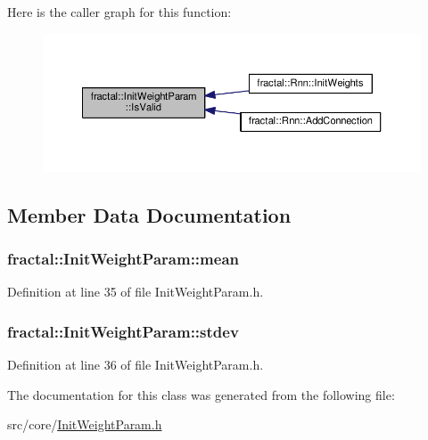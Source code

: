 Here is the caller graph for this function\+:\nopagebreak
\begin{figure}[H]
\begin{center}
\leavevmode
\includegraphics[width=350pt]{db/d0b/classfractal_1_1InitWeightParam_adef209133b1589188935bcfb306b7e8a_icgraph}
\end{center}
\end{figure}




\subsection{Member Data Documentation}
\hypertarget{classfractal_1_1InitWeightParam_af34e10c526d4f2bd0b3d610b1f899359}{
\subsubsection[{mean}]{ fractal\+::\+Init\+Weight\+Param\+::mean}}\label{classfractal_1_1InitWeightParam_af34e10c526d4f2bd0b3d610b1f899359}


Definition at line 35 of file Init\+Weight\+Param.\+h.

\hypertarget{classfractal_1_1InitWeightParam_ad2bf1b55480d3c4e4e6ff9557c246267}{
\subsubsection[{stdev}]{ fractal\+::\+Init\+Weight\+Param\+::stdev}}\label{classfractal_1_1InitWeightParam_ad2bf1b55480d3c4e4e6ff9557c246267}


Definition at line 36 of file Init\+Weight\+Param.\+h.



The documentation for this class was generated from the following file\+:\begin{DoxyCompactItemize}
\item 
src/core/\hyperlink{InitWeightParam_8h}{Init\+Weight\+Param.\+h}\end{DoxyCompactItemize}
